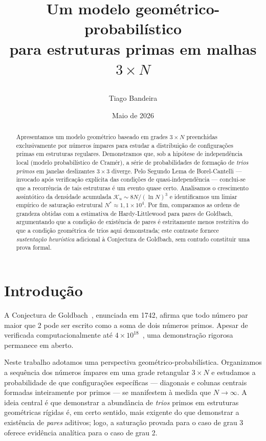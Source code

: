 \documentclass{article}
\title{%
	
	Um modelo geométrico-probabilístico \\ para estruturas primas em malhas $3 \times N$
	
}
\author{Tiago Bandeira}
\date{Maio de 2026}
\begin{document}
	
	\maketitle
	
	\begin{abstract}
		Apresentamos um modelo geométrico baseado em grades $3 \times N$
		preenchidas exclusivamente por números ímpares para estudar a
		distribuição de configurações primas em estruturas regulares.
		Demonstramos que, sob a hipótese de independência local (modelo
		probabilístico de Cramér), a série de probabilidades de formação
		de \emph{trios primos} em janelas deslizantes $3 \times 3$ diverge.
		Pelo Segundo Lema de Borel-Cantelli — invocado após verificação
		explícita das condições de quasi-independência — conclui-se que a
		recorrência de tais estruturas é um evento quase certo.
		Analisamos o crescimento assintótico da densidade acumulada
		$\mathcal{K}_u \sim 8N/(\ln N)^{3}$ e identificamos um limiar
		empírico de saturação estrutural $N^{*} \approx 1{,}1 \times 10^{4}$.
		Por fim, comparamos as ordens de grandeza obtidas com a estimativa
		de Hardy-Littlewood para pares de Goldbach, argumentando que a
		condição de existência de pares é estritamente menos restritiva do
		que a condição geométrica de trios aqui demonstrada; este contraste
		fornece \emph{sustentação heurística} adicional à Conjectura de
		Goldbach, sem contudo constituir uma prova formal.
	\end{abstract}
	
	\tableofcontents
	\vspace{1cm}
	
	\section{Introdução}
	
	A Conjectura de Goldbach~\cite{goldbach1742}, enunciada em 1742,
	afirma que todo número par maior que 2 pode ser escrito como a
	soma de dois números primos. Apesar de verificada computacionalmente
	até $4 \times 10^{18}$~\cite{oliveira2014}, uma demonstração
	rigorosa permanece em aberto.
	
	Neste trabalho adotamos uma perspectiva geométrico-probabilística.
	Organizamos a sequência dos números ímpares em uma grade retangular
	$3 \times N$ e estudamos a probabilidade de que configurações
	específicas — diagonais e colunas centrais formadas inteiramente
	por primos — se manifestem à medida que $N \to \infty$. A ideia
	central é que demonstrar a abundância de \emph{trios} primos em
	estruturas geométricas rígidas é, em certo sentido, mais exigente
	do que demonstrar a existência de \emph{pares} aditivos; logo, a
	saturação provada para o caso de grau 3 oferece evidência analítica
	para o caso de grau 2.
	
\end{document}
